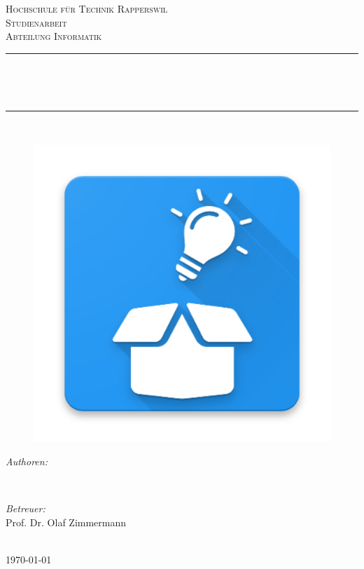 \begin{titlepage}

\newcommand{\HRule}{\rule{\linewidth}{0.5mm}} %

\center %


\textsc{\LARGE Hochschule für Technik Rapperswil }\\[1.5cm] %
\textsc{\Large Studienarbeit}\\[0.5cm] %
\textsc{\large Abteilung Informatik}\\[0.5cm] %


\makeatletter
\HRule \\[0.4cm]
\begin{doublespacing}
{ \huge \textbf{\@title}}\\[0.2cm] %
\end{doublespacing}
\HRule \\[0.4cm]
 
\begin{figure}[h]
	\centering
	\includegraphics[width=0.7\linewidth]{img/logo/logo}
	\label{fig:logo}
\end{figure}


\begin{minipage}{0.45\textwidth}
\begin{flushleft} \large
\emph{Authoren:}\\
\@author
\end{flushleft}
\end{minipage}
~
\begin{minipage}{0.45\textwidth}
\begin{flushright} \large
\emph{Betreuer:} \\
Prof. Dr. Olaf Zimmermann \\[1.2em] %
\end{flushright}
\end{minipage}\\[1cm]


{\large \today}\\[2cm] %

\vfill %

\end{titlepage}